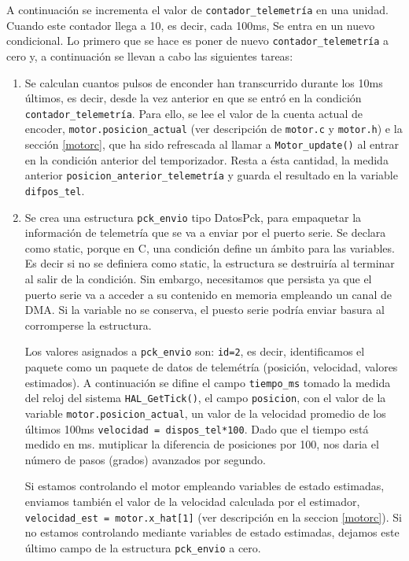 A continuación se incrementa el valor de \texttt{contador\_telemetría} en una unidad. Cuando este contador llega a 10, es decir, cada 100ms, Se entra en un nuevo condicional. Lo primero que se hace es poner de nuevo \texttt{contador\_telemetría} a cero y, a continuación se llevan a cabo las siguientes tareas:
\begin{enumerate}
\item Se calculan cuantos pulsos de enconder han transcurrido durante los 10ms últimos, es decir, desde la vez anterior en que se entró en la condición \texttt{contador\_telemetría}. Para ello, se lee el valor de la cuenta actual de encoder, \texttt{motor.posicion\_actual} (ver descripción de \texttt{motor.c} y \texttt{motor.h}) e la sección \ref{motorc}, que ha sido refrescada al llamar a \texttt{Motor\_update()} al entrar en la condición anterior del temporizador. Resta a ésta cantidad, la medida anterior \texttt{posicion\_anterior\_telemetría} y guarda el resultado en la variable \texttt{difpos\_tel}.

\item Se crea una estructura \texttt{pck\_envio} tipo DatosPck, para empaquetar la información de telemetría que se va a enviar por el puerto serie. Se declara como static, porque en C, una condición define un ámbito para las variables. Es decir si no se definiera como static, la estructura se destruiría al terminar al salir de la condición. Sin embargo, necesitamos que persista ya que el puerto serie va a acceder a su contenido en memoria empleando un canal de DMA. Si la variable no se conserva, el puesto serie podría enviar basura al corromperse la estructura.

Los valores asignados a \texttt{pck\_envio} son: \texttt{id=2}, es decir, identificamos el paquete como un paquete de datos de telemétría (posición, velocidad, valores estimados). A continuación se difine el campo \texttt{tiempo\_ms} tomado la medida del reloj del sistema \texttt{HAL\_GetTick()}, el campo \texttt{posicion}, con el valor de la variable \texttt{motor.posicion\_actual}, un valor de la velocidad promedio de los últimos 100ms \texttt{velocidad = dispos\_tel*100}. Dado que el tiempo está medido en ms. mutiplicar la diferencia de posiciones por 100, nos daria el número de pasos (grados) avanzados por segundo.

Si estamos controlando el motor empleando variables de estado estimadas, enviamos también el valor de la velocidad calculada por el estimador, \texttt{velocidad\_est = motor.x\_hat[1]} (ver descripción en la seccion \ref{motorc}). Si no estamos controlando mediante variables de estado estimadas, dejamos este último campo de la estructura \texttt{pck\_envio} a cero. 


\end{enumerate}
